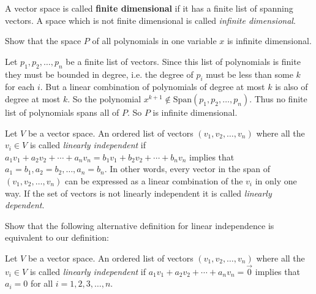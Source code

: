 \documentclass{ximera}
\begin{document}
 
  \begin{definition}
 	A vector space is called \textbf{finite dimensional} if it has a finite list of spanning vectors.  A space which is not finite dimensional is called \textit{infinite dimensional}.
 \end{definition}
 
 	Show that the space $P$ of all polynomials in one variable $x$ is infinite dimensional.

\begin{free-response}
	 Let $p_1,p_2,\ldots,p_n$ be a finite list of  vectors.  
	Since this list of polynomials is finite they must be bounded in degree, i.e.  the degree of $p_i$ must be less than some $k$ for each $i$.  But a linear combination
	of polynomials of degree at most $k$ is also of degree at most $k$.  So the polynomial $x^{k+1} \not\in  \textrm{Span}(p_1,p_2,\ldots,p_n)$. Thus no finite list of 
	polynomials spans all of $P$.  So $P$ is infinite dimensional.
\end{free-response}

 \begin{definition}
 	Let $V$ be a vector space. An ordered list of vectors $(v_1,v_2,\ldots,v_n)$ where all the $v_i \in V$ is called \textit{linearly independent} if
 	$a_1v_1+a_2v_2 + \cdots +a_nv_n = b_1v_1 + b_2v_2 + \cdots + b_nv_n$ implies that $a_1  = b_1, a_2 = b_2, \ldots,a_n=b_n$.  In other words,
 	every vector in the span of $(v_1,v_2,\ldots,v_n)$ can be expressed as a linear combination of the $v_i$ in only one way.  
 	If the set of vectors is not linearly independent it is called \textit{linearly dependent}.
 \end{definition}
 
 
 	Show that the following alternative definition for linear independence is equivalent to our definition:
 	
 	\begin{definition}
 		Let $V$ be a vector space. An ordered list of vectors $(v_1,v_2,\ldots,v_n)$ where all the $v_i \in V$ is called \textit{linearly independent} if
 	$a_1v_1+a_2v_2 + \cdots +a_nv_n = \vec{0}$ implies that $a_i = 0 $ for all $i=1,2,3,\ldots,n$.
 	\end{definition}
 	
\end{document}
